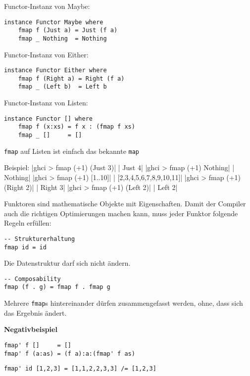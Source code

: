 \documentclass{beamer}
\begin{document}
\begin{frame}[fragile]
Functor-Instanz von Maybe:
\begin{verbatim}
instance Functor Maybe where
    fmap f (Just a) = Just (f a)
    fmap _ Nothing  = Nothing
\end{verbatim}
\pause
Functor-Instanz von Either:
\begin{verbatim}
instance Functor Either where
    fmap f (Right a) = Right (f a)
    fmap _ (Left b)  = Left b
\end{verbatim}
\pause
Functor-Instanz von Listen:
\begin{verbatim}
instance Functor [] where
    fmap f (x:xs) = f x : (fmap f xs)
    fmap _ []     = []
\end{verbatim}
\texttt{fmap} auf Listen ist einfach das bekannte \texttt{map}
\end{frame}


\begin{frame}[fragile]
Beispiel:
|ghci > fmap (+1) (Just 3)|
\pause
{}|       Just 4|
|ghci > fmap (+1) Nothing|
\pause
{}|       Nothing|
|ghci > fmap (+1) [1..10]|
\pause
{}|       [2,3,4,5,6,7,8,9,10,11]|
|ghci > fmap (+1) (Right 2)|
\pause
{}|       Right 3|
|ghci > fmap (+1) (Left 2)|
\pause
{}|       Left 2|
\end{frame}

\begin{frame}[fragile]
Funktoren sind mathematische Objekte mit Eigenschaften. Damit der Compiler auch die richtigen Optimierungen machen kann, muss jeder Funktor folgende Regeln erfüllen:\\
\pause
\begin{verbatim}
-- Strukturerhaltung
fmap id = id
\end{verbatim}
Die Datenstruktur darf sich nicht ändern.\\
\pause
\bigskip
\begin{verbatim}
-- Composability
fmap (f . g) = fmap f . fmap g
\end{verbatim}
Mehrere \texttt{fmap}s hintereinander dürfen zusammengefasst werden, ohne, dass sich das Ergebnis ändert.
\end{frame}

\begin{frame}[fragile]
\begin{important}\begin{center}\textbf{Negativbeispiel}\end{center}\end{important}
\begin{verbatim}
fmap' f []     = []
fmap' f (a:as) = (f a):a:(fmap' f as)
\end{verbatim}
\pause
\begin{verbatim}
fmap' id [1,2,3] = [1,1,2,2,3,3] /= [1,2,3]
\end{verbatim}
\end{frame}
\end{document}
